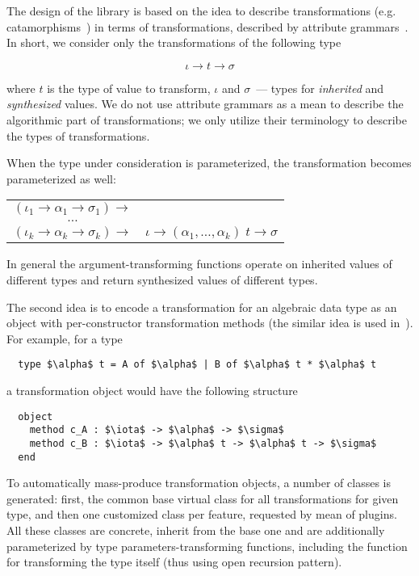 \documentclass[submission,copyright,creativecommons]{eptcs}
\begin{document}
The design of the library is based on the idea to describe transformations (e.g. catamorphisms~\cite{Bananas}) in terms of transformations, described by
attribute grammars~\cite{AGKnuth,AGSwierstra}. In short, we consider only the transformations of the following type

\[
\iota \to t \to \sigma
\]

where $t$ is the type of value to transform, $\iota$ and $\sigma$~--- types for \emph{inherited} and \emph{synthesized} values. We do not use attribute
grammars as a mean to describe the algorithmic part of transformations; we only utilize their terminology to describe the types of transformations.

When the type under consideration is parameterized, the transformation becomes parameterized as well:

\begin{tabular}{cl}
  $(\iota_1 \to \alpha_1 \to \sigma_1) \to$ & \\
  $\dots$                                  & \\
  $(\iota_k \to \alpha_k \to \sigma_k) \to$ & $\iota \to (\alpha_1,\dots,\alpha_k)\;t \to \sigma$
\end{tabular}

In general the argument-transforming functions operate on inherited values of different types and return synthesized values of different types.

The second idea is to encode a transformation for an algebraic data type as an object with per-constructor transformation methods (the similar idea is
used in~\cite{Visitors}). For example, for a type

\begin{lstlisting}
  type $\alpha$ t = A of $\alpha$ | B of $\alpha$ t * $\alpha$ t 
\end{lstlisting}

a transformation object would have the following structure

\begin{lstlisting}
  object
    method c_A : $\iota$ -> $\alpha$ -> $\sigma$
    method c_B : $\iota$ -> $\alpha$ t -> $\alpha$ t -> $\sigma$
  end
\end{lstlisting}

To automatically mass-produce transformation objects, a number of classes is generated: first, the common base virtual class for all transformations for
given type, and then one customized class per feature, requested by mean of plugins. All these classes are concrete, inherit from the
base one and are additionally parameterized by type parameters-transforming functions, including the function for transforming the type itself (thus
using open recursion pattern).
\end{document}
